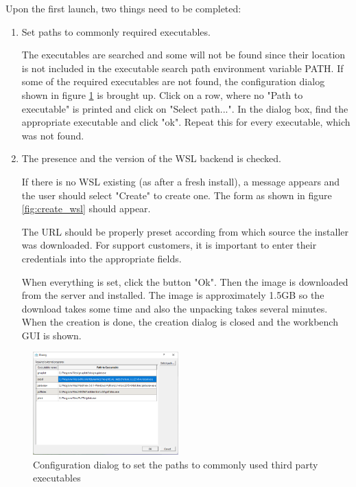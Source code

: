 Upon the first launch, two things need to be completed:
\begin{enumerate}
\item Set paths to commonly required executables.

The executables are searched and some will not be found since their location is not included in the executable search path environment variable PATH.
If some of the required executables are not found, the configuration dialog shown in figure \ref{fig:set_paths} is brought up.
Click on a row, where no "Path to executable" is printed and click on "Select path...". 
In the dialog box, find the appropriate executable and click "ok".
Repeat this for every executable, which was not found.

\item The presence and the version of the WSL backend is checked.

If there is no WSL existing (as after a fresh install), a message appears and the user should select "Create" to create one.
The form as shown in figure \ref{fig:create_wsl} should appear.

The URL should be properly preset according from which source the installer was downloaded.
For support customers, it is important to enter their credentials into the appropriate fields.

When everything is set, click the button "Ok".
Then the image is downloaded from the server and installed.
The image is approximately 1.5GB so the download takes some time and also the unpacking takes several minutes.
When the creation is done, the creation dialog is closed and the workbench GUI is shown.

\end{enumerate}

\begin{figure}[ht]
\centering
\includegraphics[width=0.5\textwidth]{figs/workbench/set_paths}
\caption{Configuration dialog to set the paths to commonly used third party executables}
\label{fig:set_paths}
\end{figure}

